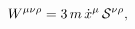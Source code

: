 \begin{equation}
W^{\mu \nu \rho }=3\,m\,\dot{x}^{\mu }\Bbb{\,}\mathcal{S}^{\nu \rho },
\end{equation}

